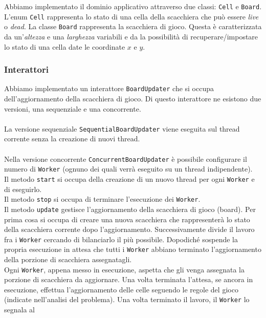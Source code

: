 \documentclass[a4paper]{article}
\begin{document}
Abbiamo implementato il dominio applicativo attraverso due classi:
\texttt{Cell} e \texttt{Board}.\\
L'enum \texttt{Cell} rappresenta lo stato di una cella della scacchiera che può essere \emph{live} o \emph{dead}.
La classe \texttt{Board} rappresenta la scacchiera di gioco. Questa è
caratterizzata da un'\emph{altezza} e una \emph{larghezza} variabili e da la possibilità di recuperare/impostare lo stato di una cella date le coordinate $x$ e $y$.

\subsubsection{Interattori}\label{interattori}

Abbiamo implementato un interattore \texttt{BoardUpdater} che si occupa dell'aggiornamento della scacchiera di gioco. Di questo interattore ne esistono due versioni, una sequenziale e una concorrente.\\\\
La versione sequenziale \texttt{SequentialBoardUpdater} viene eseguita sul thread corrente senza la creazione di nuovi thread.\\\\
Nella versione concorrente \texttt{ConcurrentBoardUpdater} è possibile configurare il numero di \texttt{Worker} (ognuno dei quali verrà
eseguito su un thread indipendente).\\
Il metodo \texttt{start} si occupa della creazione di un nuovo thread
per ogni \texttt{Worker} e di eseguirlo.\\
Il metodo \texttt{stop} si occupa di terminare l'esecuzione dei
\texttt{Worker}.\\
Il metodo \texttt{update} gestisce l'aggiornamento della scacchiera di gioco (board). Per prima cosa si occupa di creare una nuova scacchiera che rappresenterà lo stato della scacchiera corrente dopo
l'aggiornamento. Successivamente divide il lavoro fra i \texttt{Worker} cercando di bilanciarlo il più possibile. Dopodiché sospende la propria esecuzione in attesa che tutti i \texttt{Worker} abbiano terminato
l'aggiornamento della porzione di scacchiera assegnatagli.\\
Ogni \texttt{Worker}, appena messo in esecuzione, aspetta che gli venga assegnata la porzione di scacchiera da aggiornare. Una volta terminata l'attesa, se ancora in esecuzione, effettua l'aggiornamento delle celle seguendo le regole del gioco (indicate nell'analisi del problema). Una volta terminato il lavoro, il \texttt{Worker} lo segnala al
\end{document}
